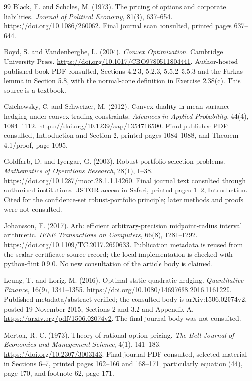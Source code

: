 \documentclass[11pt]{article}
\begin{document}
\begin{thebibliography}{99}
Black, F. and Scholes, M. (1973). The pricing of options and corporate liabilities. \emph{Journal of Political Economy}, 81(3), 637--654. \url{https://doi.org/10.1086/260062}. Final journal scan consulted, printed pages 637--644.

Boyd, S. and Vandenberghe, L. (2004). \emph{Convex Optimization}. Cambridge University Press. \url{https://doi.org/10.1017/CBO9780511804441}. Author-hosted published-book PDF consulted, Sections 4.2.3, 5.2.3, 5.5.2--5.5.3 and the Farkas lemma in Section 5.8, with the normal-cone definition in Exercise 2.38(c). This source is a textbook.

Czichowsky, C. and Schweizer, M. (2012). Convex duality in mean-variance hedging under convex trading constraints. \emph{Advances in Applied Probability}, 44(4), 1084--1112. \url{https://doi.org/10.1239/aap/1354716590}. Final publisher PDF consulted, Introduction and Section 2, printed pages 1084--1088, and Theorem 4.1/proof, page 1095.

Goldfarb, D. and Iyengar, G. (2003). Robust portfolio selection problems.
\emph{Mathematics of Operations Research}, 28(1), 1--38.
\url{https://doi.org/10.1287/moor.28.1.1.14260}. Final journal text consulted
through authorised institutional JSTOR access in Safari, printed pages 1--2,
Introduction. Cited for the confidence-set robust-portfolio principle;
later methods and proofs were not consulted.

Johansson, F. (2017). Arb: efficient arbitrary-precision midpoint-radius interval arithmetic. \emph{IEEE Transactions on Computers}, 66(8), 1281--1292. \url{https://doi.org/10.1109/TC.2017.2690633}. Publication metadata is reused from the scalar-certificate source record; the local implementation is checked with python-flint 0.9.0. No new consultation of the article body is claimed.

Leung, T. and Lorig, M. (2016). Optimal static quadratic hedging. \emph{Quantitative Finance}, 16(9), 1341--1355. \url{https://doi.org/10.1080/14697688.2016.1161229}. Published metadata/abstract verified; the consulted body is arXiv:1506.02074v2, posted 19 November 2015, Sections 2 and 3.2 and Appendix A, \url{https://arxiv.org/pdf/1506.02074v2}. The final journal body was not consulted.

Merton, R. C. (1973). Theory of rational option pricing. \emph{The Bell Journal of Economics and Management Science}, 4(1), 141--183. \url{https://doi.org/10.2307/3003143}. Final journal PDF consulted, selected material in Sections 6--7, printed pages 162--166 and 168--171, particularly equation (44), page 170, and footnote 62, page 171.
\end{thebibliography}
\end{document}
